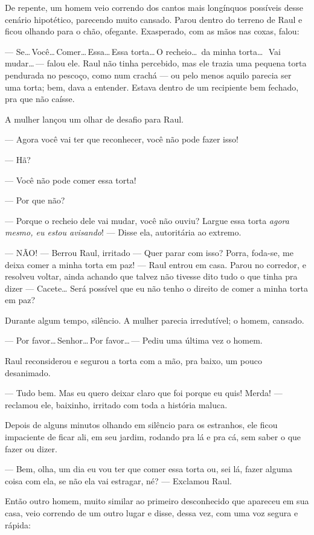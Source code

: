 De repente, um homem veio correndo dos cantos mais longínquos possíveis desse cenário hipotético, parecendo mui\-to cansado. Parou dentro do terreno de Raul e ficou olhando para o chão, ofegante. Exasperado, com as mãos nas coxas, falou:

--- Se\ldots\,Você\ldots\,Comer\ldots\,Essa\ldots\,Essa torta\ldots\,O recheio\ldots\ da minha torta\ldots\,\ Vai mudar\ldots\,--- falou ele. Raul não tinha percebido, mas ele trazia uma pequena torta pendurada no pescoço, como num crachá --- ou pelo menos aquilo parecia ser uma torta; bem, dava a entender. Estava dentro de um recipiente bem fechado, pra que não caísse.

A mulher lançou um olhar de desafio para Raul.

--- Agora você vai ter que reconhecer, você não pode fazer isso!

--- Hã?

--- Você não pode comer essa torta!

--- Por que não?

--- Porque o recheio dele vai mudar, você não ouviu? Largue essa torta \emph{agora mesmo, eu estou avisando}! --- Disse ela, autoritária ao extremo.

--- NÃO! --- Berrou Raul, irritado --- Quer parar com isso? Porra, foda-se, me deixa comer a minha torta em paz! --- Raul entrou em casa. Parou no corredor, e resolveu voltar, ainda achando que talvez não tivesse dito tudo o que tinha pra dizer --- Cacete… Será possível que eu não tenho o direito de comer a minha torta em paz?

Durante algum tempo, silêncio. A mulher parecia irredutível; o homem, cansado.

--- Por favor\ldots\,Senhor\ldots\,Por favor\ldots\,--- Pediu uma última vez o homem.

Raul reconsiderou e segurou a torta com a mão, pra baixo, um pouco desanimado.

--- Tudo bem. Mas eu quero deixar claro que foi porque eu quis! Merda! --- reclamou ele, baixinho, irritado com toda a história maluca.

Depois de alguns minutos olhando em silêncio para os estranhos, ele ficou impaciente de ficar ali, em seu jardim, rodando pra lá e pra cá, sem saber o que fazer ou dizer.

--- Bem, olha, um dia eu vou ter que comer essa torta ou, sei lá, fazer alguma coisa com ela, se não ela vai estragar, né? --- Exclamou Raul.

Então outro homem, muito similar ao primeiro desconhecido que apareceu em sua casa, veio correndo de um outro lugar e disse, dessa vez, com uma voz segura e rápida:

